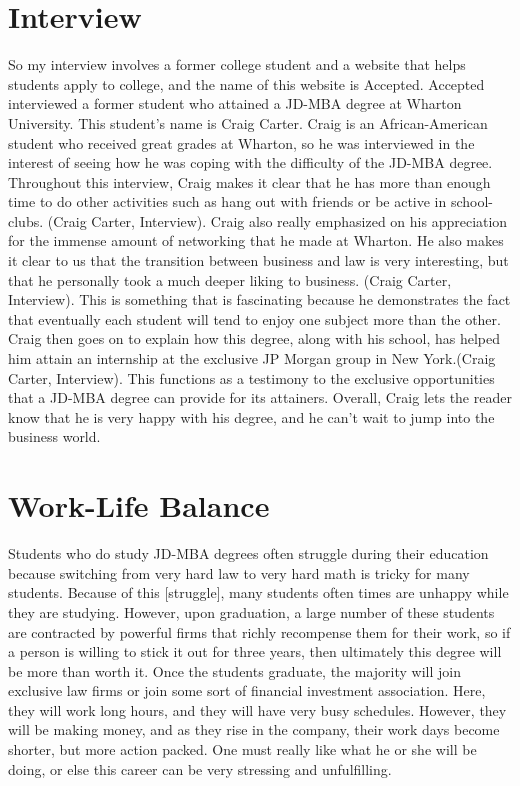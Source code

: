 \begin{multicols}{2}
\section{Interview}
	So my interview involves a former college student and a website that helps students apply to college, and the name of this website is Accepted. Accepted interviewed a former student who attained a JD-MBA degree at Wharton University. This student’s name is Craig Carter. Craig is an African-American student who received great grades at Wharton, so he was interviewed in the interest of seeing how he was coping with the difficulty of the JD-MBA degree. Throughout this interview, Craig makes it clear that he has more than enough time to do other activities such as hang out with friends or be active in school-clubs. (Craig Carter, Interview). Craig also really emphasized on his appreciation for the immense amount of networking that he made at Wharton. He also makes it clear to us that the transition between business and law is very interesting, but that he personally took a much deeper liking to business. (Craig Carter, Interview). This is something that is fascinating because he demonstrates the fact that eventually each student will tend to enjoy one subject more than the other. Craig then goes on to explain how this degree, along with his school, has helped him attain an internship at the exclusive JP Morgan group in New York.(Craig Carter, Interview). This functions as a testimony to the exclusive opportunities that a JD-MBA degree can provide for its attainers. Overall, Craig lets the reader know that he is very happy with his degree, and he can't wait to jump into the business world. 

\section{Work-Life Balance}
	Students who do study JD-MBA degrees often struggle during their education because switching from very hard law to very hard math is tricky for many students. Because of this [struggle], many students often times are unhappy while they are studying. However, upon graduation, a large number of these students are contracted by powerful firms that richly recompense them for their work, so if a person is willing to stick it out for three years, then ultimately this degree will be more than worth it. Once the students graduate, the majority will join exclusive law firms or join some sort of financial investment association. Here, they will work long hours, and they will have very busy schedules. However, they will be making money, and as they rise in the company, their work days become shorter, but more action packed. One must really like what he or she will be doing, or else this career can be very stressing and unfulfilling. 
\end{multicols}